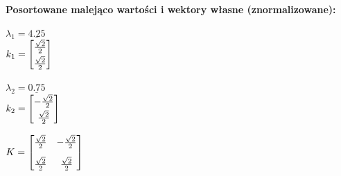 \documentclass[a4paper,11pt]{article}
\begin{document}
\bigskip
\noindent\textbf{Posortowane malejąco wartości i wektory własne (znormalizowane):}\medskip\\
\begin{minipage}{0.2\textwidth}
$\lambda_1 = \underline{4.25}$\bigskip\\
    $k_1 = \begin{bmatrix} \tfrac{\sqrt{2}}{2} \vspace{0.1cm} \\ \tfrac{\sqrt{2}}{2}\end{bmatrix}$
\end{minipage}
\hspace{0.05\textwidth}
\begin{minipage}{0.2\textwidth}
	$\lambda_2 = \underline{0.75}$\bigskip\\
    $k_2 = \begin{bmatrix} - \tfrac{\sqrt{2}}{2} \vspace{0.1cm} \\ \tfrac{\sqrt{2}}{2}\end{bmatrix}$
\end{minipage}
\hspace{0.05\textwidth}
\begin{minipage}{0.3\textwidth}
	$K = \begin{bmatrix}
	\tfrac{\sqrt{2}}{2}{} & - \tfrac{\sqrt{2}}{2} \vspace{0.3cm}\\
	\tfrac{\sqrt{2}}{2} & \tfrac{\sqrt{2}}{2}
	\end{bmatrix}$
\end{minipage}


\vspace{1cm}
\end{document}

